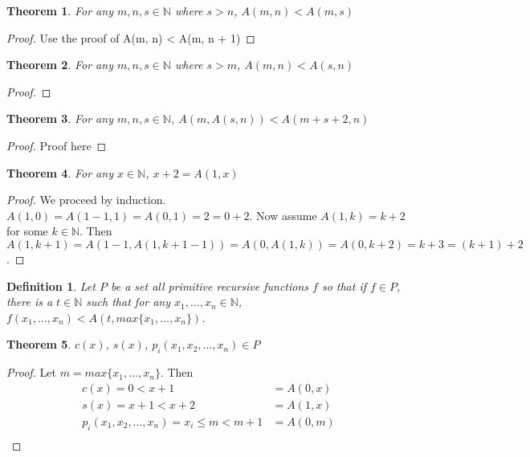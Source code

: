 \documentclass[12pt, letterpaper]{article}
\newtheorem{theorem}{Theorem}
\newtheorem*{definition}{Definition}
\theoremstyle{case}
\begin{document}
    \begin{theorem}
      \label{lt}
      For any $m, n, s \in \mathbb{N}$ where $s > n$, $A(m, n) < A(m, s)$
    \end{theorem}
    \begin{proof}
      Use the proof of A(m, n) < A(m, n + 1)
    \end{proof}

    \begin{theorem}
      For any $m, n, s \in \mathbb{N}$ where $s > m$, $A(m, n) < A(s, n)$
    \end{theorem}
    \begin{proof}
    \end{proof}

    \begin{theorem}
      \label{plus2}
      For any $m, n, s \in \mathbb{N}$, $A(m, A(s, n)) < A(m + s + 2, n)$
    \end{theorem}
    \begin{proof}
      Proof here
    \end{proof}

    \begin{theorem}
      \label{x+2=A(1,x)}
      For any $x \in \mathbb{N}$, $x + 2 = A(1, x)$
    \end{theorem}
    \begin{proof}
      We proceed by induction. \\
      $A(1, 0) = A(1 - 1, 1) = A(0, 1) = 2 = 0 + 2$. Now assume $A(1, k) = k + 2$ for some $k \in \mathbb{N}$.
      Then $A(1, k + 1) = A(1 - 1, A(1, k + 1 - 1)) = A(0, A(1, k)) = A(0, k + 2) = k + 3 = (k + 1) + 2$.
    \end{proof}
    
    \begin{definition}
      Let $P$ be a set all primitive recursive functions $f$ so that if $f \in P$, there is a $t \in \mathbb{N}$
      such that for any $x_1, ..., x_n \in \mathbb{N}$, $f(x_1, ..., x_n) < A(t, max\{x_1, ..., x_n\})$.
    \end{definition}

    \begin{theorem}
      $c(x)$, $s(x)$, $p_i(x_1, x_2, ..., x_n) \in P$
    \end{theorem}
    \begin{proof}
      Let $m = max\{x_1, ..., x_n\}$.
      Then
      \begin{equation*}
        \begin{aligned}
          c(x) = 0 < x + 1 &= A(0, x) \\
          s(x) = x + 1 < x + 2 &= A(1, x) \\
          p_i(x_1, x_2, ..., x_n) = x_i \leq m < m + 1 &= A(0, m) \\
        \end{aligned}
      \end{equation*}
    \end{proof}
\end{document}
